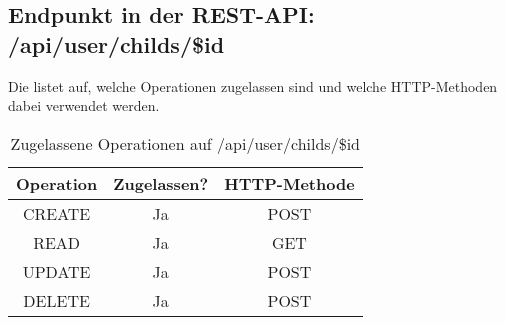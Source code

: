 \subsection{Endpunkt in der REST-API: /api/user/childs/\$id}
Die  listet auf, welche Operationen zugelassen sind und welche HTTP-Methoden dabei verwendet werden. 

\begin{table}[!htbp]
	\begin{tabular}{|c|c|c|}
		\hline
			\textbf{Operation} & \textbf{Zugelassen?} & \textbf{HTTP-Methode} \\ \hline
			CREATE & Ja & POST \\ \hline 
			READ & Ja & GET \\ \hline
			UPDATE & Ja & POST \\ \hline 
			DELETE & Ja & POST \\ \hline
	\end{tabular}

		\caption{Zugelassene Operationen auf /api/user/childs/\$id}
		\label{tab:end:rest:api:user:childs:id:meth}
\end{table}